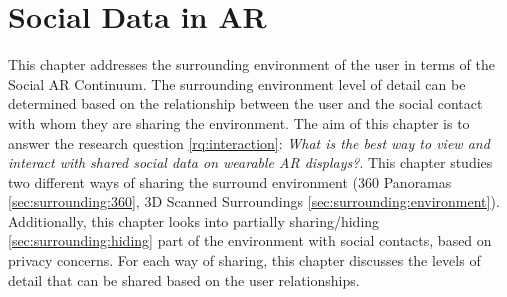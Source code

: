 \chapter{Social Data in AR} %
\label{ch:data} %

This chapter addresses the surrounding environment of the user in terms of the Social AR Continuum. The surrounding environment level of detail can be determined based on the relationship between the user and the social contact with whom they are sharing the environment. The aim of this chapter is to answer the research question \ref{rq:interaction}: \textit{What is the best way to view and interact with shared social data on wearable AR displays?}. This chapter studies two different ways of sharing the surround environment (360 Panoramas \ref{sec:surrounding:360}, 3D Scanned Surroundings \ref{sec:surrounding:environment}). Additionally, this chapter looks into partially sharing/hiding \ref{sec:surrounding:hiding} part of the environment with social contacts, based on privacy concerns. For each way of sharing, this chapter discusses the levels of detail that can be shared based on the user relationships. 





